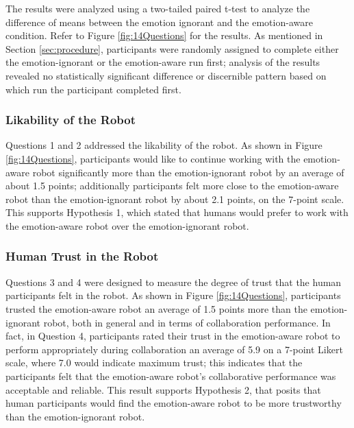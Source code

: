 \documentclass{sig-alternate-05-2015}
\begin{document}
The results were analyzed using a two-tailed paired t-test to analyze the
difference of means between the emotion ignorant and the emotion-aware
condition. Refer to Figure \ref{fig:14Questions} for the results. As mentioned
in Section \ref{sec:procedure}, participants were randomly assigned to complete
either the emotion-ignorant or the emotion-aware run first; analysis of the
results revealed no statistically significant difference or discernible pattern
based on which run the participant completed first.

\subsubsection{Likability of the Robot}
\label{sec:Likability}
Questions 1 and 2 addressed the likability of the robot. As shown in Figure
\ref{fig:14Questions}, participants would like to continue working with the emotion-aware
robot significantly more than the emotion-ignorant robot by an average of about 1.5
points; additionally participants felt more close to the emotion-aware robot
than the emotion-ignorant robot by about 2.1 points, on the 7-point scale. This
supports Hypothesis 1, which stated that humans would prefer to work with the
emotion-aware robot over the emotion-ignorant robot.

\subsubsection{Human Trust in the Robot}
\label{sec:Trust}
Questions 3 and 4 were designed to measure the degree of trust that the human
participants felt in the robot. As shown in Figure \ref{fig:14Questions},
participants trusted the emotion-aware robot an average of 1.5 points more than
the emotion-ignorant robot, both in general and in terms of collaboration
performance. In fact, in Question 4, participants rated their trust in the
emotion-aware robot to perform appropriately during collaboration an average of
5.9 on a 7-point Likert scale, where 7.0 would indicate maximum trust; this
indicates that the participants felt that the emotion-aware robot's
collaborative performance was acceptable and reliable. This result supports
Hypothesis 2, that posits that human participants would find the emotion-aware
robot to be more trustworthy than the emotion-ignorant robot.
\end{document}
